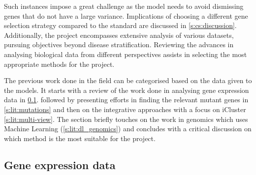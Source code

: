 Such instances impose a great challenge as the model needs to avoid dismissing genes that do not have a large variance. Implications of choosing a different gene selection strategy compared to the standard are discussed in \cref{s:cs:discussion}. Additionally, the project encompasses extensive analysis of various datasets, pursuing objectives beyond disease stratification. Reviewing the advances in analysing biological data from different perspectives assists in selecting the most appropriate methods for the project.


The previous work done in the field can be categorised based on the data given to the models. 
It starts with a review of the work done in analysing gene expression data in \ref{s:lit:rnaSeq}. followed by presenting efforts in finding the relevant mutant genes in \ref{s:lit:mutations} and then on the integrative approaches with a focus on iCluster \ref{s:lit:multi-view}. The section briefly touches on the work in genomics which uses Machine Learning (\ref{s:lit:dl_genomics}) and concludes with a critical discussion on which method is the most suitable for the project.

\subsection{Gene expression data} \label{s:lit:rnaSeq}

\vspace{3mm}
\vspace{3mm}

